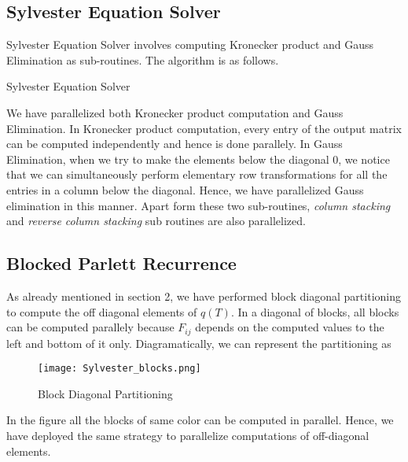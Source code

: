\documentclass[12pt,a4paper]{article}
\begin{document}
\subsection{Sylvester Equation Solver}

Sylvester Equation Solver involves computing Kronecker product and Gauss Elimination as sub-routines. The algorithm is as follows.

\begin{algorithm}
\caption{Sylvester Equation Solver}\label{euclid}
\begin{algorithmic}[1]
\State {}
\end{algorithmic}
\end{algorithm}

We have parallelized both Kronecker product computation and Gauss Elimination. In Kronecker product computation, every entry of the output matrix can be computed independently and hence is done parallely. In Gauss Elimination, when we try to make the elements below the diagonal 0, we notice that we can simultaneously perform elementary row transformations for all the entries in a column below the diagonal. Hence, we have parallelized Gauss elimination in this manner. Apart form these two sub-routines, \textit{column stacking} and \textit{reverse column stacking} sub routines are also parallelized.

\newpage
\subsection{Blocked Parlett Recurrence}

As already mentioned in section 2, we have performed block diagonal partitioning to compute the off diagonal elements of $q(T)$. In a diagonal of blocks, all blocks can be computed parallely because $F_{ij}$ depends on the computed values to the left and bottom of it only.
Diagramatically, we can represent the partitioning as


\begin{figure}
    \centering
    \texttt{[image: Sylvester\_blocks.png]}
    \caption{Block Diagonal Partitioning}
\end{figure}

In the figure all the blocks of same color can be computed in parallel. Hence, we have deployed the same strategy to parallelize computations of off-diagonal elements. 
\end{document}
